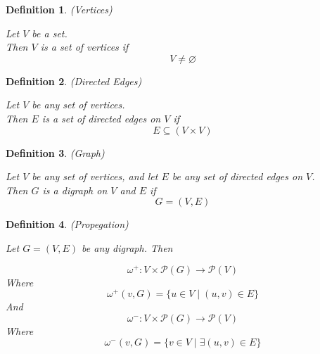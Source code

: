 \documentclass{article}
\newtheorem{defn}{Definition}[section]
\begin{document}
\medskip

\begin{defn} (Vertices)
	
	Let \(V\) be a set. \\
	Then \(V\) is a set of vertices if
	\begin{equation}
		V \neq \varnothing
	\end{equation}
\end{defn}

\medskip

\begin{defn} (Directed Edges)
	
	Let \(V\) be any set of vertices. \\
	Then \(E\) is a set of directed edges on \(V\) if 
	\begin{equation}
		E \subseteq (V \times V)
	\end{equation}
\end{defn}

\medskip

\begin{defn} (Graph)
	
		Let \(V\) be any set of vertices, and let \(E\) be any set of directed edges on \(V\). \\
		Then \(G\) is a digraph on \(V\) and \(E\) if
		\begin{equation}
			G = (V, E)
		\end{equation}
\end{defn}

\medskip

\begin{defn} (Propegation)
	
Let \(G = (V, E)\) be any digraph. Then

\begin{equation}
	\omega^+ : V \times \mathcal{P}(G) \rightarrow \mathcal{P}(V) 
\end{equation}
Where
\begin{equation*}
	\omega^+(v, G) = 
	\{u \in V \mid (u, v) \in E\}
\end{equation*}
And
\begin{equation}
	\omega^- : V \times \mathcal{P}(G) \rightarrow \mathcal{P}(V) 
\end{equation}
Where
\begin{equation*}
	\omega^-(v, G) = 
	\{v \in V \mid \exists (u, v) \in E\}
\end{equation*}

\end{defn}
\end{document}
